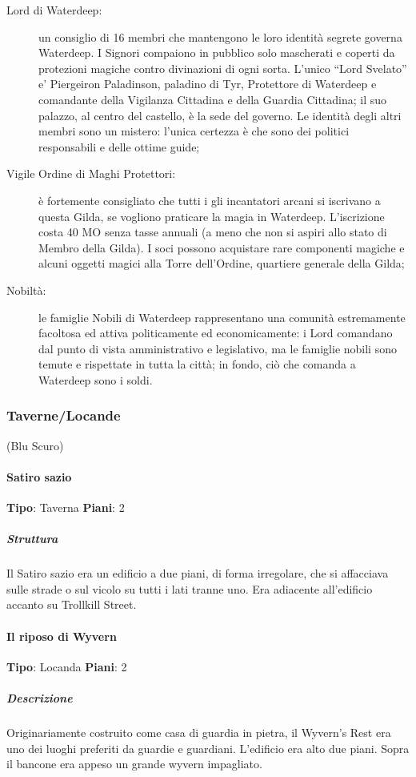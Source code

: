 \documentclass{article}
\begin{document}
\begin{description}
                              \item[Lord di Waterdeep:] un consiglio di 16 membri che mantengono le loro identità segrete governa Waterdeep. I Signori compaiono in pubblico solo mascherati e coperti da protezioni magiche contro divinazioni di ogni sorta. L’unico “Lord Svelato” e’ Piergeiron Paladinson, paladino di Tyr, Protettore di Waterdeep e comandante della Vigilanza Cittadina e della Guardia Cittadina; il suo palazzo, al centro del castello, è la sede del governo. Le identità degli altri membri sono un mistero: l’unica certezza è che sono dei politici responsabili e delle ottime guide;
                              
                              \item[Vigile Ordine di Maghi Protettori:] è fortemente consigliato che tutti i gli incantatori arcani si iscrivano a questa Gilda, se vogliono praticare la magia in Waterdeep. L’iscrizione costa 40 MO senza tasse annuali (a meno che non si aspiri allo stato di Membro della Gilda). I soci possono acquistare rare componenti magiche e alcuni oggetti magici alla Torre dell’Ordine, quartiere generale della Gilda;
                              
                              \item[Nobiltà:] le famiglie Nobili di Waterdeep rappresentano una comunità estremamente facoltosa ed attiva politicamente ed economicamente: i Lord comandano dal punto di vista amministrativo e legislativo, ma le famiglie nobili sono temute e rispettate in tutta la città; in fondo, ciò che comanda a Waterdeep sono i soldi.
                          \end{description}
              \subsubsection{Taverne/Locande} (Blu Scuro)
                  \paragraph{Satiro sazio}
                  \textbf{Tipo}: Taverna
                                    \textbf{Piani}: 2\newline
                      \subparagraph{Struttura}
                      Il Satiro sazio era un edificio a due piani, di forma irregolare, che si affacciava sulle strade o sul vicolo su tutti i lati tranne uno. Era adiacente all'edificio accanto su Trollkill Street.
                  \paragraph{Il riposo di Wyvern}
                  \textbf{Tipo}: Locanda
                                    \textbf{Piani}: 2 \newline
                      \subparagraph{Descrizione}
                        Originariamente costruito come casa di guardia in pietra, il Wyvern's Rest era uno dei luoghi preferiti da guardie e guardiani. L'edificio era alto due piani. Sopra il bancone era appeso un grande wyvern impagliato.
\end{document}
